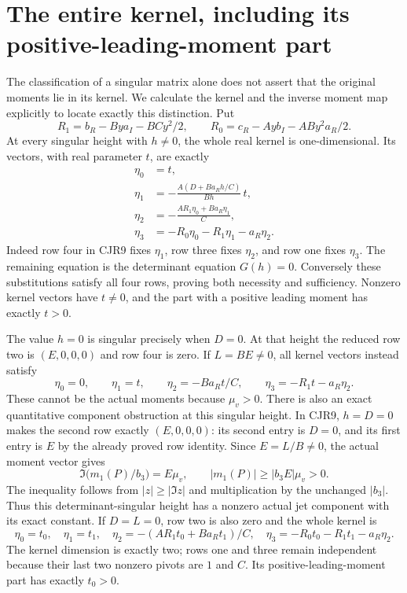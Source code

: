 \documentclass[11pt]{article}
\begin{document}
\section{The entire kernel, including its positive-leading-moment part}
The classification of a singular matrix alone does not assert that
the original moments lie in its kernel. We calculate the kernel and
the inverse moment map explicitly to locate exactly this distinction.
Put
\[
 R_1=b_R-Bya_I-BCy^2/2,\qquad
 R_0=c_R-Ayb_I-ABy^2a_R/2.
 \tag{CJR15}
\]
At every singular height with $h\ne0$, the whole real kernel is
one-dimensional. Its vectors, with real parameter $t$, are exactly
\[
\begin{split}
 \eta_0&=t,\\
 \eta_1&=-\frac{A(D+Ba_Rh/C)}{Bh}\,t,\\
 \eta_2&=-\frac{AR_1\eta_0+Ba_R\eta_1}{C},\\
 \eta_3&=-R_0\eta_0-R_1\eta_1-a_R\eta_2.
\end{split}\tag{CJR16}
\]
Indeed row four in CJR9 fixes $\eta_1$, row three fixes
$\eta_2$, and row one fixes $\eta_3$. The remaining equation is
the determinant equation $G(h)=0$. Conversely these substitutions
satisfy all four rows, proving both necessity and sufficiency.
Nonzero kernel vectors have $t\ne0$, and the part with a positive
leading moment has exactly $t>0$.

The value $h=0$ is singular precisely when $D=0$. At that height
the reduced row two is $(E,0,0,0)$ and row four is zero.
If $L=BE\ne0$, all kernel vectors instead satisfy
\[
 \eta_0=0,\qquad \eta_1=t,\qquad
 \eta_2=-Ba_Rt/C,\qquad
 \eta_3=-R_1t-a_R\eta_2.
 \tag{CJR17}
\]
These cannot be the actual moments because $\mu_v>0$.
There is also an exact quantitative component obstruction at this
singular height. In CJR9, $h=D=0$ makes the second row exactly
$(E,0,0,0)$: its second entry is $D=0$, and its first entry is
$E$ by the already proved row identity. Since $E=L/B\ne0$,
the actual moment vector gives
\[
 \Im\bigl(m_1(P)/b_3\bigr)=E\mu_v,\qquad
 |m_1(P)|\ge |b_3E|\mu_v>0.
 \tag{CJR17a}
\]
The inequality follows from $|z|\ge|\Im z|$ and multiplication
by the unchanged $|b_3|$. Thus this determinant-singular height
has a nonzero actual jet component with its exact constant.
If $D=L=0$, row two is also zero and the whole kernel is
\[
 \eta_0=t_0,\quad \eta_1=t_1,\quad
 \eta_2=-(AR_1t_0+Ba_Rt_1)/C,\quad
 \eta_3=-R_0t_0-R_1t_1-a_R\eta_2.
 \tag{CJR18}
\]
The kernel dimension is exactly two; rows one and three remain
independent because their last two nonzero pivots are $1$ and $C$.
Its positive-leading-moment part has exactly $t_0>0$.
\end{document}
